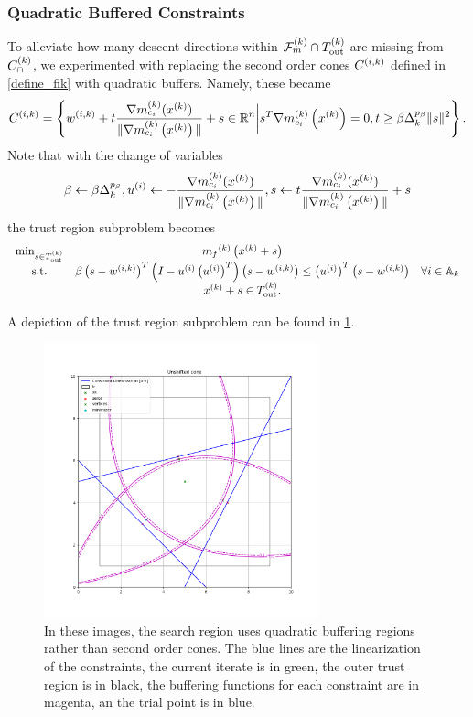 \subsubsection{Quadratic Buffered Constraints}
\label{quadratic_buffered_description}

To alleviate how many descent directions within ${\mathcal F_m^{(k)}} \cap {T_{\text{out}}^{(k)}}$ are missing from ${C^{(k)}_{\cap}}$, 
we experimented with replacing the second order cones ${C^{(i, k)}}$ defined in \cref{define_fik} with quadratic buffers.
Namely, these became
\begin{align*}
{C^{(i, k)}} = \left\{{w^{(i, k)}} + t{\frac{\nabla m^{(k)}_{c_i}(x^{(k)})}{\|\nabla m^{(k)}_{c_i}\left(x^{(k)}\right)\|}} + s \in \mathbb R^n \bigg |  s^T{\nabla m_{c_i}^{(k)}\left(x^{(k)}\right)} = 0, t \ge \beta \Delta_k^{p_{\beta}} \|s\|^2 \right\}.
\end{align*}
Note that with the change of variables 
\begin{align*}
\beta \gets \beta \Delta_k^{p_{\beta}}, u^{(i)} \gets -{\frac{\nabla m^{(k)}_{c_i}(x^{(k)})}{\|\nabla m^{(k)}_{c_i}\left(x^{(k)}\right)\|}}, s \gets t{\frac{\nabla m^{(k)}_{c_i}(x^{(k)})}{\|\nabla m^{(k)}_{c_i}\left(x^{(k)}\right)\|}} + s
\end{align*}
the trust region subproblem becomes
\begin{align*}
\begin{array}{ccc}
\min_{s \in {T_{\text{out}}^{(k)}}} & {{m}_f}^{(k)}\left(x^{(k)} + s\right) & \\
\textrm{s.t.} & \beta \left(s-{w^{(i, k)}}\right)^T\left(I - u^{(i)}\left(u^{(i)}\right)^T\right) \left(s-{w^{(i, k)}}\right)\le \left(u^{(i)}\right)^T\left(s-{w^{(i, k)}}\right) & \forall i \in {\mathbb A_{k}} \\
& x^{(k)} + s \in {T_{\text{out}}^{(k)}}. &
\end{array}
\end{align*}


A depiction of the trust region subproblem can be found in \cref{quadratic_buffered}.

\begin{figure}[ht]
    \centering
    \includegraphics[width=300px]{images/quadratic_buffered.png}
    \caption[The quadratic buffered region.]
	{
		In these images, the search region uses quadratic buffering regions rather than second order cones.
		The blue lines are the linearization of the constraints,
		the current iterate is in green,
		the outer trust region is in black,
		the buffering functions for each constraint are in magenta,
		an the trial point is in blue.
    }
    \label{quadratic_buffered}
\end{figure}


